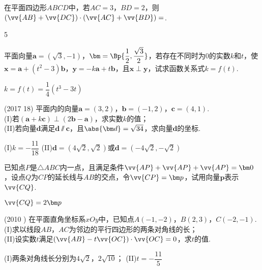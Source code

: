 \begin{exercise}
    在平面四边形$ABCD$中，若$AC=3$，$BD=2$，则$(\vv{AB}+\vv{DC})\cdot(\vv{AC}+\vv{BD})=$\tk.
    \begin{answer}
      5
    \end{answer}
  \item%
    平面向量$\bm a=(\sqrt{3},-1)$，$\bm=\Bp{\dfrac12,\dfrac{\sqrt3}2}$，若存在不同时为0的实数$k$和$t$，使$\bm x=\bm a+(t^2-3)\bm b$，$\bm y=-k\bm a+t\bm b$，且$\bm x\perp\bm y$，试求函数关系式$k=f(t)$.
    \begin{answer}
      $k=f(t)=\dfrac14(t^3-3t)$
    \end{answer}
  \vspace{2.5cm}
  \item%
    (2017  18)
    平面内的向量$\bm a=(3,2)$，$\bm b=(-1,2)$，$\bm c=(4,1)$.\\
    (I)若$(\bm a+k\bm c)\perp(2\bm b-\bm a)$，求实数$k$的值；\\
    (II)若向量$\bm d$满足$\bm d\varparallel\bm c$，且$\abs{\bm d}=\sqrt{34}$，求向量$\bm d$的坐标.
    \begin{answer}
      (I)$k=-\dfrac{11}{18}$
      (II)$\bm d=(4\sqrt2,\sqrt2)$或$\bm d=(-4\sqrt2,-\sqrt2)$
    \end{answer}
  \vspace{5cm}
  \item
    已知点$P$是$\triangle{ABC}$内一点，且满足条件$\vv{AP}+\vv{AP}+\vv{AP}=\bm 0$，设点$Q$为$CP$的延长线与$AB$的交点，令$\vv{CP}=\bm p$，试用向量$\bm p$表示$\vv{CQ}$.
    \begin{answer}
      $\vv{CQ}=2\bm p$
    \end{answer}
  \vspace{6cm}
  \item%
    (2010 )
    在平面直角坐标系$xOy$中，已知点$A(-1,-2)$，$B(2,3)$，$C(-2,-1)$.\\
    (I)求以线段$AB$，$AC$为邻边的平行四边形的两条对角线的长；\\
    (II)设实数$t$满足$(\vv{AB}-t\vv{OC})\cdot\vv{OC}=0$，求$t$的值.
    \begin{answer}
      (I)两条对角线长分别为$4\sqrt2$，$2\sqrt{10}$；
      (II)$t=-\dfrac{11}5$
    \end{answer}
\end{exercise}
\stopexercise

